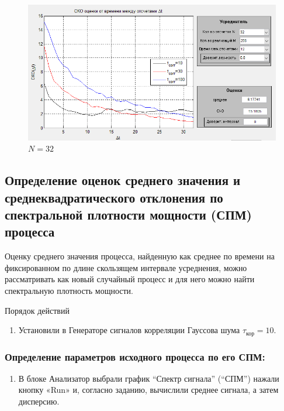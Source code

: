 \begin{enumerate}
\begin{figure}[H]
	\centering
    \includegraphics[width=\linewidth]{fig/fig42}
	\caption{$N = 32$}
    \label{fig:4.2}
\end{figure}
\end{enumerate}
\subsection[Задание 5]{Определение оценок среднего значения и среднеквадратического отклонения по спектральной плотности мощности (СПМ) процесса}
Оценку среднего значения процесса, найденную как среднее по времени на фиксированном по длине скользящем интервале усреднения, можно рассматривать как новый случайный процесс и для него можно найти спектральную плотность мощности.

Порядок действий
\begin{enumerate}
	\item Установили в Генераторе сигналов корреляции Гауссова шума $\tau_\text{кор}=10$.
\end{enumerate}
\subsubsection[Задание 5.1]{Определение параметров исходного процесса по его СПМ:}
\begin{enumerate}
	\item В блоке Анализатор выбрали график “Спектр сигнала” (“СПМ”) нажали кнопку «Run» и, согласно заданию, вычислили среднее сигнала, а затем дисперсию.
\end{enumerate}


